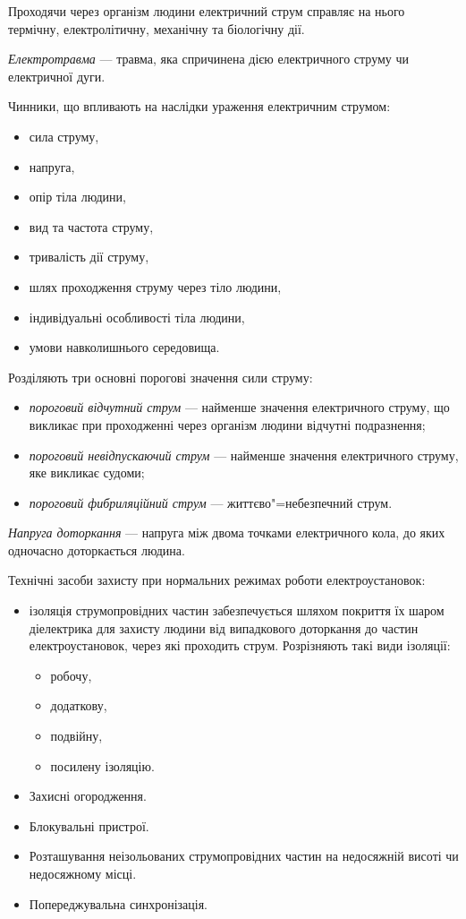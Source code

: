 \documentclass[a5paper,10pt,notitlepage,pdftex,headsepline]{scrartcl}
\begin{document}
  Проходячи через організм людини електричний струм справляє на нього
  термічну, електролітичну, механічну та біологічну дії.

  \emph{Електротравма} --- травма, яка спричинена дією електричного струму чи
  електричної дуги.

  Чинники, що впливають на наслідки ураження електричним струмом:
  \begin{itemize}
    \item сила струму,
    \item напруга,
    \item опір тіла людини,
    \item вид та частота струму,
    \item тривалість дії струму,
    \item шлях проходження струму через тіло людини,
    \item індивідуальні особливості тіла людини,
    \item умови навколишнього середовища.
  \end{itemize}

  Розділяють три основні порогові значення сили струму:
  \begin{itemize}
    \item \emph{пороговий відчутний струм} --- найменше значення електричного
      струму, що викликає при проходженні через організм людини відчутні
      подразнення;
    \item \emph{пороговий невідпускаючий струм} --- найменше значення
      електричного струму, яке викликає судоми;
    \item \emph{пороговий фибриляційний струм} --- життєво"=небезпечний струм.
  \end{itemize}

  \emph{Напруга доторкання} --- напруга між двома точками електричного кола,
  до яких одночасно доторкається людина.

  Технічні засоби захисту при нормальних режимах роботи електроустановок:
  \begin{itemize}
    \item ізоляція струмопровідних частин забезпечується шляхом покриття їх
      шаром діелектрика для захисту людини від випадкового доторкання до
      частин електроустановок, через які проходить струм.
      Розрізняють такі види ізоляції:
      \begin{itemize}
        \item робочу,
        \item додаткову,
        \item подвійну,
        \item посилену ізоляцію.
      \end{itemize}
    \item Захисні огородження.
    \item Блокувальні пристрої.
    \item Розташування неізольованих струмопровідних частин на недосяжній
      висоті чи недосяжному місці.
    \item Попереджувальна синхронізація.
  \end{itemize}
\end{document}
